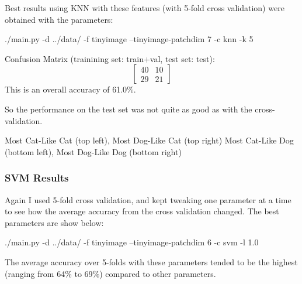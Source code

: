\documentclass[fleqn]{article}
\begin{document}
Best results using KNN with these features (with 5-fold cross validation) were obtained with the parameters:
\begin{solution}
./main.py -d ../data/ -f tinyimage --tinyimage-patchdim 7  -c knn -k 5
\end{solution}

Confusion Matrix (trainining set: train+val, test set: test):
\[
  \begin{bmatrix}
    40 & 10 \\
    29 & 21
  \end{bmatrix}
\]
This is an overall accuracy of 61.0\%.

So the performance on the test set was not quite as good as with the cross-validation.
\begin{center}
    Most Cat-Like Cat (top left), Most Dog-Like Cat (top right)\break
    Most Cat-Like Dog (bottom left), Most Dog-Like Dog (bottom right)
\end{center}

\subsubsection{SVM Results}
Again I used 5-fold cross validation, and kept tweaking one parameter at a time to see how the average accuracy from the cross validation changed.  The best parameters are show below:
\begin{solution}
    ./main.py -d ../data/ -f tinyimage --tinyimage-patchdim 6 -c svm -l 1.0
\end{solution}
The average accuracy over 5-folds with these parameters tended to be the highest (ranging from 64\% to 69\%) compared to other parameters.
\end{document}
